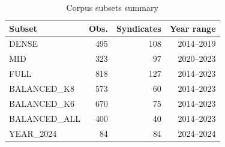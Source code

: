 \begin{table}[htbp]
\centering
\caption{Corpus subsets summary}
\label{tab:corpus_summary}
\begin{tabular}{lrrr}
\toprule
\textbf{Subset} & \textbf{Obs.} & \textbf{Syndicates} & \textbf{Year range} \\
\midrule
DENSE & 495 & 108 & 2014--2019 \\
MID & 323 & 97 & 2020--2023 \\
FULL & 818 & 127 & 2014--2023 \\
BALANCED_K8 & 573 & 60 & 2014--2023 \\
BALANCED_K6 & 670 & 75 & 2014--2023 \\
BALANCED_ALL & 400 & 40 & 2014--2023 \\
YEAR_2024 & 84 & 84 & 2024--2024 \\
\bottomrule
\end{tabular}
\end{table}
